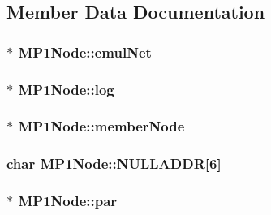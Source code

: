 \subsection{\-Member \-Data \-Documentation}
\hypertarget{class_m_p1_node_a449d3fc835bd980a1fd9af2072f05b0e}{
\subsubsection[{emul\-Net}]{$\ast$ {\bf \-M\-P1\-Node\-::emul\-Net}}}\label{db/d4b/class_m_p1_node_a449d3fc835bd980a1fd9af2072f05b0e}
\hypertarget{class_m_p1_node_aaba40df80a4669363245ac74c3ff19f5}{
\subsubsection[{log}]{$\ast$ {\bf \-M\-P1\-Node\-::log}}}\label{db/d4b/class_m_p1_node_aaba40df80a4669363245ac74c3ff19f5}
\hypertarget{class_m_p1_node_a328d012a8827407b51ea765ee420b8a3}{
\subsubsection[{member\-Node}]{$\ast$ {\bf \-M\-P1\-Node\-::member\-Node}}}\label{db/d4b/class_m_p1_node_a328d012a8827407b51ea765ee420b8a3}
\hypertarget{class_m_p1_node_a796defbef0578537c785a1c806127bb4}{
\subsubsection[{\-N\-U\-L\-L\-A\-D\-D\-R}]{\setlength{\rightskip}{0pt plus 5cm}char {\bf \-M\-P1\-Node\-::\-N\-U\-L\-L\-A\-D\-D\-R}\mbox{[}6\mbox{]}}}\label{db/d4b/class_m_p1_node_a796defbef0578537c785a1c806127bb4}
\hypertarget{class_m_p1_node_ae2fee312946f5db771601f0c1b05f50d}{
\subsubsection[{par}]{$\ast$ {\bf \-M\-P1\-Node\-::par}}}\label{db/d4b/class_m_p1_node_ae2fee312946f5db771601f0c1b05f50d}


